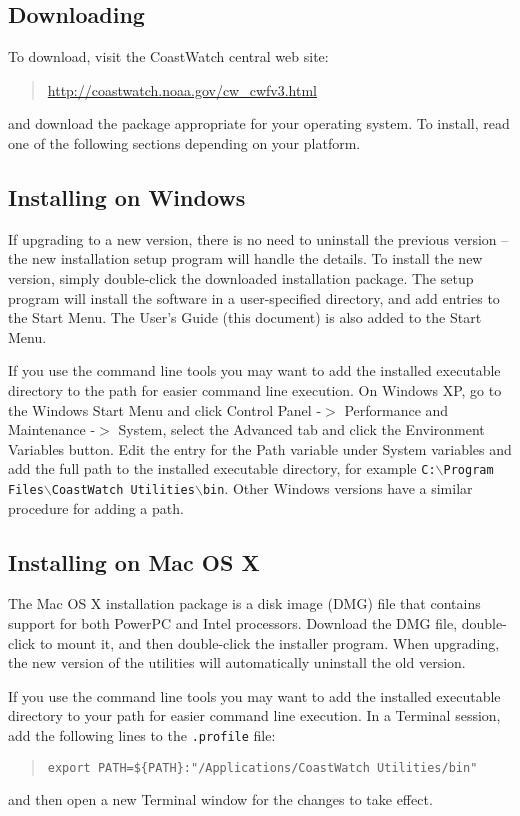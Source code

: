 {\subsection{Downloading}

To download, visit the CoastWatch central web site: 
\begin{quote}
  \url{http://coastwatch.noaa.gov/cw\_cwfv3.html}
\end{quote}
and download the package appropriate for your operating system. To
install, read one of the following sections depending on your
platform.

\subsection{Installing on Windows}

If upgrading to a new version, there is no need to uninstall the
previous version -- the new installation setup program will handle
the details.  To install the new version, simply double-click the
downloaded installation package. The setup program will install the
software in a user-specified directory, and add entries to the Start
Menu.  The User's Guide (this document) is also added to the Start
Menu.

If you use the command line tools you may want to add the installed
executable directory to the path for easier command line execution.
On Windows XP, go to the Windows {\gui Start Menu} and click {\gui
Control Panel} -$>$ {\gui Performance and Maintenance} -$>$ {\gui
System}, select the {\gui Advanced} tab and click the {\gui Environment
Variables} button. Edit the entry for the {\gui Path} variable under
{\gui System variables} and add the full path to the installed
executable directory, for example {\tt C:$\backslash$Program
Files$\backslash$CoastWatch Utilities$\backslash$bin}. Other Windows
versions have a similar procedure for adding a path.

\subsection{Installing on Mac OS X}

The Mac OS X installation package is a disk image (DMG) file that
contains support for both PowerPC and Intel processors.  
Download the DMG file, double-click to mount it, and then
double-click the installer program.  When upgrading, the new version
of the utilities will automatically uninstall the old version.

If you use the command line tools you may want to add the installed
executable directory to your path for easier command line execution.
In a Terminal session, add the following lines to the {\tt .profile}
file:
\begin{quote}
  {\tt export PATH=\$\{PATH\}:"/Applications/CoastWatch Utilities/bin"}
\end{quote}
and then open a new Terminal window for the changes to take effect.

}
